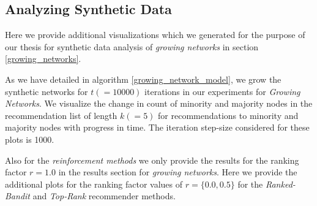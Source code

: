 \begin{appendices}

\chapter{Analyzing Synthetic Data}
Here we provide additional visualizations which we generated for the purpose of our thesis for synthetic data analysis of \textit{growing networks} in section \ref{growing_networks}.

As we have detailed in algorithm \ref{growing_network_model}, we grow the synthetic networks for $t(=10000)$ iterations in our experiments for \textit{Growing Networks}. We visualize the change in count of minority and majority nodes in the recommendation list of length $k(=5)$ for recommendations to minority and majority nodes with progress in time. The iteration step-size considered for these plots is 1000.

Also for the \textit{reinforcement methods} we only provide the results for the ranking factor $r=1.0$ in the results section for \textit{growing networks}. Here we provide the additional plots for the ranking factor values of $r=\{0.0, 0.5\}$ for the \textit{Ranked-Bandit} and \textit{Top-Rank} recommender methods.



\end{appendices}
